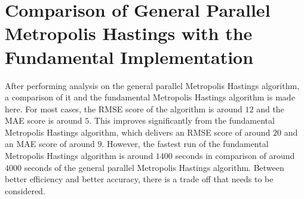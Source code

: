 \section{Comparison of General Parallel Metropolis Hastings with the Fundamental Implementation}
After performing analysis on the general parallel Metropolis Hastings algorithm, a comparison of it and the fundamental Metropolis Hastings algorithm is made here. For most cases, the RMSE score of the algorithm is around $12$ and the MAE score is around $5$. This improves significantly from the fundamental Metropolis Hastings algorithm, which delivers an RMSE score of around $20$ and an MAE score of around $9$. However, the fastest run of the fundamental Metropolis Hastings algorithm is around $1400$ seconds in comparison of around $4000$ seconds of the general parallel Metropolis Hastings algorithm. Between better efficiency and better accuracy, there is a trade off that needs to be considered.